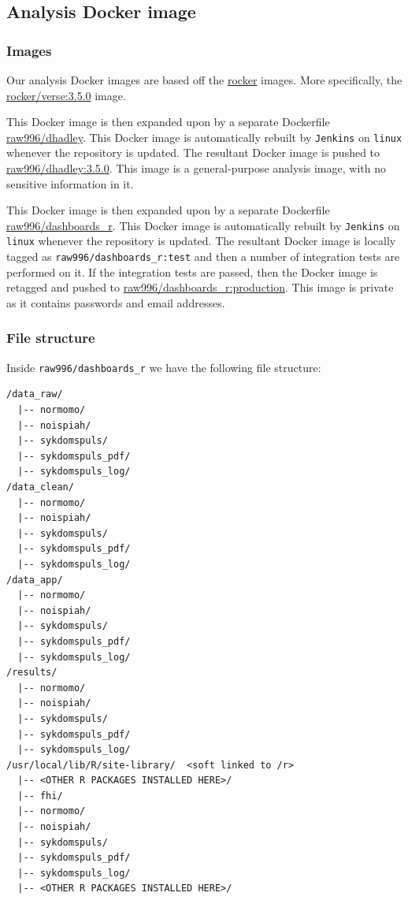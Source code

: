 \documentclass[12pt,]{article}
\begin{document}
\subsection{Analysis Docker image}\label{analysis-docker-image}

\subsubsection{Images}\label{images}

Our analysis Docker images are based off the
\href{https://rocker-project.org}{rocker} images. More specifically, the
\href{https://hub.docker.com/r/rocker/verse/}{rocker/verse:3.5.0} image.

This Docker image is then expanded upon by a separate Dockerfile
\href{https://github.com/raubreywhite/docker/blob/master/dhadley/Dockerfile}{raw996/dhadley}.
This Docker image is automatically rebuilt by \texttt{Jenkins} on
\texttt{linux} whenever the repository is updated. The resultant Docker
image is pushed to
\href{https://hub.docker.com/r/raw996/dhadley/}{raw996/dhadley:3.5.0}.
This image is a general-purpose analysis image, with no sensitive
information in it.

This Docker image is then expanded upon by a separate Dockerfile
\href{https://github.com/raubreywhite/dashboards_control/blob/master/infrastructure/dashboards_r/Dockerfile}{raw996/dashboards\_r}.
This Docker image is automatically rebuilt by \texttt{Jenkins} on
\texttt{linux} whenever the repository is updated. The resultant Docker
image is locally tagged as \texttt{raw996/dashboards\_r:test} and then a
number of integration tests are performed on it. If the integration
tests are passed, then the Docker image is retagged and pushed to
\href{https://hub.docker.com/r/raw996/dashboards_r/}{raw996/dashboards\_r:production}.
This image is private as it contains passwords and email addresses.

\subsubsection{File structure}\label{file-structure}

Inside \texttt{raw996/dashboards\_r} we have the following file
structure:

\begin{verbatim}
/data_raw/
  |-- normomo/
  |-- noispiah/
  |-- sykdomspuls/
  |-- sykdomspuls_pdf/
  |-- sykdomspuls_log/
/data_clean/
  |-- normomo/
  |-- noispiah/
  |-- sykdomspuls/
  |-- sykdomspuls_pdf/
  |-- sykdomspuls_log/
/data_app/
  |-- normomo/
  |-- noispiah/
  |-- sykdomspuls/
  |-- sykdomspuls_pdf/
  |-- sykdomspuls_log/
/results/
  |-- normomo/
  |-- noispiah/
  |-- sykdomspuls/
  |-- sykdomspuls_pdf/
  |-- sykdomspuls_log/
/usr/local/lib/R/site-library/  <soft linked to /r>
  |-- <OTHER R PACKAGES INSTALLED HERE>/
  |-- fhi/
  |-- normomo/
  |-- noispiah/
  |-- sykdomspuls/
  |-- sykdomspuls_pdf/
  |-- sykdomspuls_log/
  |-- <OTHER R PACKAGES INSTALLED HERE>/
\end{verbatim}
\end{document}
